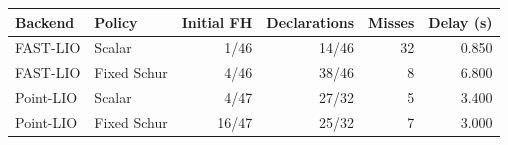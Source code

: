\begin{tabular}{@{}llrrrr@{}}
\toprule
Backend & Policy & Initial FH & Declarations & Misses & Delay (s)\\\midrule
FAST-LIO & Scalar & 1/46 & 14/46 & 32 & 0.850\\
FAST-LIO & Fixed Schur & 4/46 & 38/46 & 8 & 6.800\\
Point-LIO & Scalar & 4/47 & 27/32 & 5 & 3.400\\
Point-LIO & Fixed Schur & 16/47 & 25/32 & 7 & 3.000\\
\bottomrule
\end{tabular}
